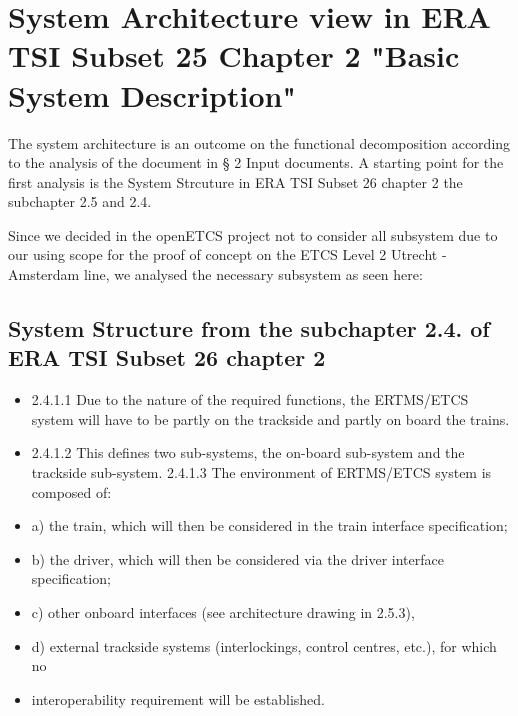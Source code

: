 
\section{System Architecture view in ERA TSI Subset 25 Chapter 2 "Basic System Description"}
The system architecture is an outcome on the functional decomposition according to the analysis of the document in § 2 Input documents. A starting point for the first analysis is the System Strcuture in ERA TSI Subset 26 chapter 2 the subchapter 2.5 and 2.4.

Since we decided in the openETCS project not to consider all subsystem due to our using scope for the proof of concept on the ETCS Level 2 Utrecht - Amsterdam line, we analysed the necessary subsystem as seen here:

\subsection{System Structure from the subchapter 2.4. of ERA TSI Subset 26 chapter 2}

\begin{itemize}
\item 2.4.1.1	Due to the nature of the required functions, the ERTMS/ETCS system will have to be partly on the trackside and partly on board the trains. 
\item 2.4.1.2	This defines two sub-systems, the on-board sub-system and the trackside sub-system.
2.4.1.3	The environment of ERTMS/ETCS system is composed of:
\item a)	the train, which will then be considered in the train interface specification;
\item b)	the driver, which will then be considered via the driver interface specification;
\item c)	other onboard interfaces (see architecture drawing in 2.5.3),
\item d)	external trackside systems (interlockings, control centres, etc.), for which no 
\item interoperability requirement will be established.
\end{itemize}

